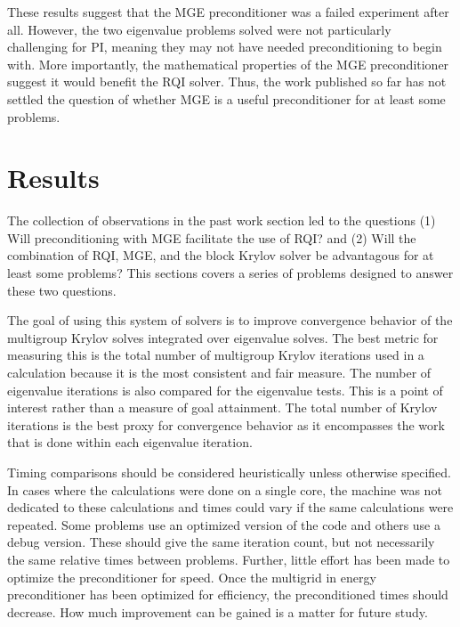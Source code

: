 \documentclass[preprint,12pt]{elsarticle}
\begin{document}
These results suggest that the MGE preconditioner was a failed experiment after all. However, the two eigenvalue problems solved were not particularly challenging for PI, meaning they may not have needed preconditioning to begin with. More importantly, the mathematical properties of the MGE preconditioner suggest it would benefit the RQI solver. Thus, the work published so far has not settled the question of whether MGE is a useful preconditioner for at least some problems. 

\section{Results}
\label{sec:results}
The collection of observations in the past work section led to the questions (1) Will preconditioning with MGE facilitate the use of RQI? and (2) Will the combination of RQI, MGE, and the block Krylov solver be advantagous for at least some problems? This sections covers a series of problems designed to answer these two questions. 

The goal of using this system of solvers is to improve convergence behavior of the multigroup Krylov solves integrated over eigenvalue solves. The best metric for measuring this is the total number of multigroup Krylov iterations used in a calculation because it is the most consistent and fair measure. The number of eigenvalue iterations is also compared for the eigenvalue tests. This is a point of interest rather than a measure of goal attainment. The total number of Krylov iterations is the best proxy for convergence behavior as it encompasses the work that is done within each eigenvalue iteration.  

Timing comparisons should be considered heuristically unless otherwise specified. In cases where the calculations were done on a single core, the machine was not dedicated to these calculations and times could vary if the same calculations were repeated. Some problems use an optimized version of the code and others use a debug version. These should give the same iteration count, but not necessarily the same relative times between problems. Further, little effort has been made to optimize the preconditioner for speed. Once the multigrid in energy preconditioner has been optimized for efficiency, the preconditioned times should decrease. How much improvement can be gained is a matter for future study. 
\end{document}
